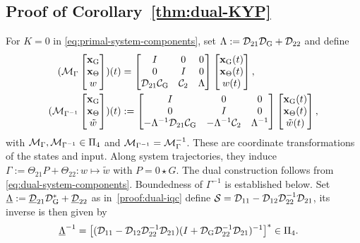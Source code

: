 
\subsection{Proof of Corollary~\ref{thm:dual-KYP}}\label{proof:dual-KYP}
\begingroup
\setlength{\abovedisplayskip}{4pt plus 1pt minus 1pt}
\setlength{\belowdisplayskip}{4pt plus 1pt minus 1pt}
\setlength{\abovedisplayshortskip}{2pt plus 1pt}
\setlength{\belowdisplayshortskip}{4pt plus 1pt minus 1pt}
For $K=0$ in \eqref{eq:primal-system-components}, set
$\Lambda:=\mathcal{D}_{21}\mathcal{D}_{{\mathrm{G}}}+\mathcal{D}_{22}$ and define
\begin{align*}
(\mathcal{M}_\Gamma\begin{bmatrix}\mathbf{x}_{\mathrm{G}}\\\mathbf{x}_\Theta\\w\end{bmatrix})(t)
&=\begin{bmatrix}
I&0&0\\
0&I&0\\
\mathcal{D}_{21}\mathcal{C}_{{\mathrm{G}}}&\mathcal{C}_2
&\Lambda
\end{bmatrix}\begin{bmatrix}\mathbf{x}_{\mathrm{G}}(t)\\\mathbf{x}_\Theta(t)\\w(t)\end{bmatrix},\\
(\mathcal{M}_{\Gamma^{-1}}\begin{bmatrix}\mathbf{x}_{\mathrm{G}}\\\mathbf{x}_\Theta\\\tilde{w}\end{bmatrix})(t)
&:=\begin{bmatrix}
I&0&0\\
0&I&0\\
-\Lambda^{-1}\mathcal{D}_{21}\mathcal{C}_{{\mathrm{G}}}&-\Lambda^{-1}\mathcal{C}_2&\Lambda^{-1}
\end{bmatrix}\begin{bmatrix}\mathbf{x}_{\mathrm{G}}(t)\\\mathbf{x}_\Theta(t)\\\tilde{w}(t)\end{bmatrix},
\end{align*}
with $\mathcal{M}_\Gamma,\mathcal{M}_{\Gamma^{-1}}\in\Pi_4$ and
$\mathcal{M}_{\Gamma^{-1}}=\mathcal{M}_\Gamma^{-1}$. These are coordinate
transformations of the states and input. Along system trajectories, they
induce $\Gamma:=\Theta_{21}P+\Theta_{22}:w\mapsto\tilde w$ with $P=0\star G$.
The dual construction follows from \eqref{eq:dual-system-components}.
Boundedness of $\Gamma^{-1}$ is established below.
Set $\underline\Lambda:=\underline{\mathcal{D}}_{21}\mathcal{D}_{{\mathrm{G}}}^*
+\underline{\mathcal{D}}_{22}$ as in~\ref{proof:dual-iqc} define $\mathcal{S} = \mathcal{D}_{11} - \mathcal{D}_{12}\mathcal{D}_{22}^{-1}\mathcal{D}_{21}$,
its inverse is then given by
\begin{equation}\label{eq:dual-feedthrough-inverse}
\begin{aligned}
\underline\Lambda^{-1}
&=\left[(\mathcal{D}_{11}-\mathcal{D}_{12}\mathcal{D}_{22}^{-1}\mathcal{D}_{21})
 (I+\mathcal{D}_{{\mathrm{G}}}\mathcal{D}_{22}^{-1}\mathcal{D}_{21})^{-1}\right]^*\in\Pi_4.
\end{aligned}
\end{equation}
